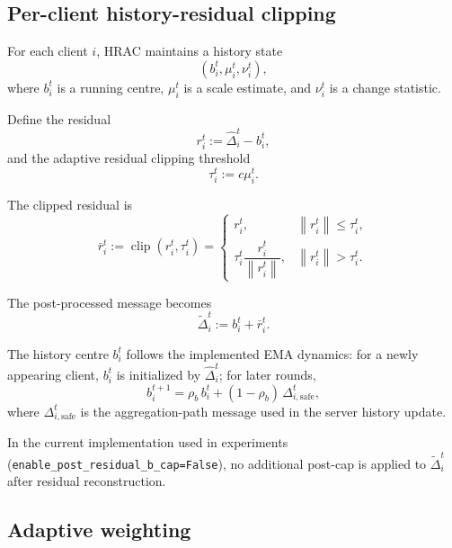 \documentclass[11pt,a4paper]{article}
\theoremstyle{remark}
\newcommand{\clip}{\operatorname{clip}}
\newcommand{\norm}[1]{\left\lVert #1 \right\rVert}
\begin{document}
\subsection{Per-client history-residual clipping}

For each client \(i\), HRAC maintains a history state
\[
    (b_i^t,\mu_i^t,\nu_i^t),
\]
where \(b_i^t\) is a running centre, \(\mu_i^t\) is a scale estimate, and
\(\nu_i^t\) is a change statistic.

Define the residual
\begin{equation}
    r_i^t := \hat{\Delta}_i^t - b_i^t,
    \label{eq:residual}
\end{equation}
and the adaptive residual clipping threshold
\begin{equation}
    \tau_i^t := c \mu_i^t.
    \label{eq:tau}
\end{equation}

The clipped residual is
\begin{equation}
    \bar{r}_i^t
    :=
    \clip(r_i^t, \tau_i^t)
    =
    \begin{cases}
        r_i^t, & \norm{r_i^t} \le \tau_i^t,\\[2mm]
        \tau_i^t \dfrac{r_i^t}{\norm{r_i^t}}, & \norm{r_i^t} > \tau_i^t.
    \end{cases}
    \label{eq:residual_clip}
\end{equation}

The post-processed message becomes
\begin{equation}
    \tilde{\Delta}_i^t := b_i^t + \bar{r}_i^t.
    \label{eq:delta_tilde}
\end{equation}

The history centre \(b_i^t\) follows the implemented EMA dynamics:
for a newly appearing client, \(b_i^t\) is initialized by
\(\hat{\Delta}_i^t\); for later rounds,
\begin{equation}
    b_i^{t+1}
    =
    \rho_b\, b_i^t + (1-\rho_b)\,\Delta_{i,\mathrm{safe}}^t,
    \label{eq:b_update}
\end{equation}
where \(\Delta_{i,\mathrm{safe}}^t\) is the aggregation-path message used in
the server history update.

In the current implementation used in experiments
(\texttt{enable\_post\_residual\_b\_cap=False}), no additional post-cap is
applied to \(\tilde{\Delta}_i^t\) after residual reconstruction.

\subsection{Adaptive weighting}
\end{document}
